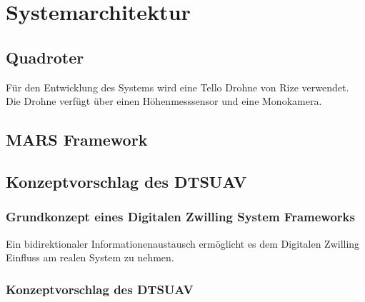\section{Systemarchitektur}

\subsection{Quadroter}
Für den Entwicklung des Systems wird eine Tello Drohne von Rize verwendet. Die Drohne verfügt über einen Höhenmesssensor und eine Monokamera. 




\subsection{MARS Framework}

\subsection{Konzeptvorschlag des DTSUAV}

\subsubsection{Grundkonzept eines Digitalen Zwilling System Frameworks}

Ein bidirektionaler Informationenaustausch ermöglicht es dem Digitalen Zwilling Einfluss am realen System zu nehmen. 





\subsubsection{Konzeptvorschlag des DTSUAV}

